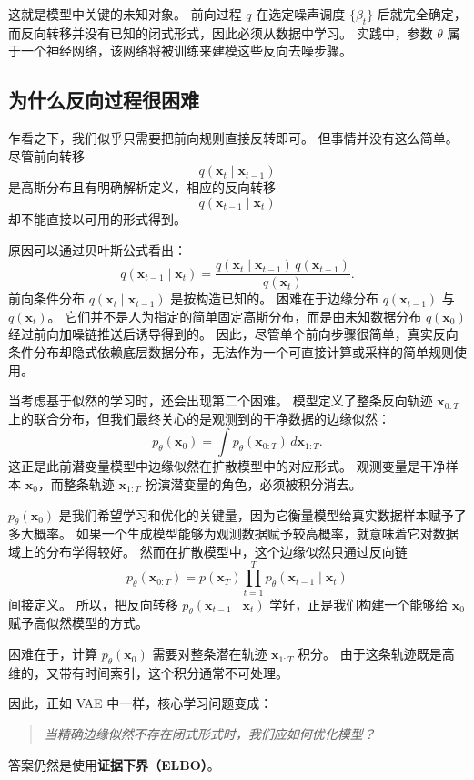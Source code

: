 这就是模型中关键的未知对象。
前向过程 $q$ 在选定噪声调度 $\{\beta_t\}$ 后就完全确定，而反向转移并没有已知的闭式形式，因此必须从数据中学习。
实践中，参数 $\theta$ 属于一个神经网络，该网络将被训练来建模这些反向去噪步骤。

\subsection{为什么反向过程很困难}

乍看之下，我们似乎只需要把前向规则直接反转即可。
但事情并没有这么简单。
尽管前向转移
\[
q(\mathbf{x}_t\mid \mathbf{x}_{t-1})
\]
是高斯分布且有明确解析定义，相应的反向转移
\[
q(\mathbf{x}_{t-1}\mid \mathbf{x}_t)
\]
却不能直接以可用的形式得到。

原因可以通过贝叶斯公式看出：
\[
q(\mathbf{x}_{t-1}\mid \mathbf{x}_t)
=
\frac{
q(\mathbf{x}_t\mid \mathbf{x}_{t-1})\,q(\mathbf{x}_{t-1})
}{
q(\mathbf{x}_t)
}.
\]
前向条件分布 $q(\mathbf{x}_t\mid \mathbf{x}_{t-1})$ 是按构造已知的。
困难在于边缘分布 $q(\mathbf{x}_{t-1})$ 与 $q(\mathbf{x}_t)$。
它们并不是人为指定的简单固定高斯分布，而是由未知数据分布 $q(\mathbf{x}_0)$ 经过前向加噪链推送后诱导得到的。
因此，尽管单个前向步骤很简单，真实反向条件分布却隐式依赖底层数据分布，无法作为一个可直接计算或采样的简单规则使用。

当考虑基于似然的学习时，还会出现第二个困难。
模型定义了整条反向轨迹 $\mathbf{x}_{0:T}$ 上的联合分布，但我们最终关心的是观测到的干净数据的边缘似然：
\[
p_\theta(\mathbf{x}_0)
=
\int p_\theta(\mathbf{x}_{0:T})\,d\mathbf{x}_{1:T}.
\]
这正是此前潜变量模型中边缘似然在扩散模型中的对应形式。
观测变量是干净样本 $\mathbf{x}_0$，而整条轨迹 $\mathbf{x}_{1:T}$ 扮演潜变量的角色，必须被积分消去。

$p_\theta(\mathbf{x}_0)$ 是我们希望学习和优化的关键量，因为它衡量模型给真实数据样本赋予了多大概率。
如果一个生成模型能够为观测数据赋予较高概率，就意味着它对数据域上的分布学得较好。
然而在扩散模型中，这个边缘似然只通过反向链
\[
p_\theta(\mathbf{x}_{0:T})
=
p(\mathbf{x}_T)\prod_{t=1}^{T} p_\theta(\mathbf{x}_{t-1}\mid \mathbf{x}_t)
\]
间接定义。
所以，把反向转移 $p_\theta(\mathbf{x}_{t-1}\mid \mathbf{x}_t)$ 学好，正是我们构建一个能够给 $\mathbf{x}_0$ 赋予高似然模型的方式。

困难在于，计算 $p_\theta(\mathbf{x}_0)$ 需要对整条潜在轨迹 $\mathbf{x}_{1:T}$ 积分。
由于这条轨迹既是高维的，又带有时间索引，这个积分通常不可处理。

因此，正如 VAE 中一样，核心学习问题变成：
\begin{quote}
\emph{当精确边缘似然不存在闭式形式时，我们应如何优化模型？}
\end{quote}
答案仍然是使用\textbf{证据下界（ELBO）}。

